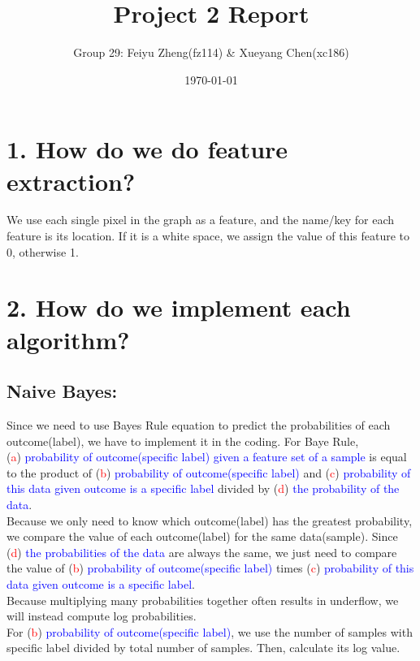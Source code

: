 \documentclass[11pt]{article}
\title{Project 2 Report}
\author{Group 29: Feiyu Zheng(fz114) \& Xueyang Chen(xc186)}
\date{\today}
\begin{document}
	\maketitle
	\section*{1. How do we do feature extraction?}
		We use each single pixel in the graph as a feature, and the name/key for each feature is its location. If it is a white space, we assign the value of this feature to 0, otherwise 1.

	\section*{2. How do we implement each algorithm?}
		\subsection*{Naive Bayes:}
			\flushleft{}Since we need to use Bayes Rule equation to predict the probabilities of each outcome(label), we have to implement it in the coding. For Baye Rule, \\(\textcolor{red}{a}) \textcolor{blue}{probability of outcome(specific label) given a feature set of a sample} is equal to the product of (\textcolor{red}{b}) \textcolor{blue}{probability of outcome(specific label)} and (\textcolor{red}{c}) \textcolor{blue}{probability of this data given outcome is a specific label} divided by (\textcolor{red}{d}) \textcolor{blue}{the probability of the data}.\\
			\flushleft{}Because we only need to know which outcome(label) has the greatest probability, we compare the value of each outcome(label) for the same data(sample). Since (\textcolor{red}{d}) \textcolor{blue}{the probabilities of the data} are always the same, we just need to compare the value of (\textcolor{red}{b}) \textcolor{blue}{probability of outcome(specific label)} times (\textcolor{red}{c}) \textcolor{blue}{probability of this data given outcome is a specific label}.\\
			\flushleft{}Because multiplying many probabilities together often results in underflow, we will instead compute log probabilities.\\
			
			\flushleft{}For (\textcolor{red}{b}) \textcolor{blue}{probability of outcome(specific label)}, we use the number of samples with specific label divided by total number of samples. Then, calculate its log value.\\
			
\end{document}
